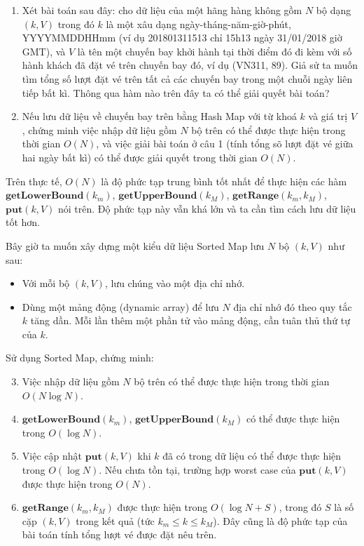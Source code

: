 \documentclass{article}
\begin{document}
 \begin{em}
	\begin{enumerate}
        \item Xét bài toán sau đây: cho dữ liệu của một hãng hàng không gồm $N$ bộ dạng $(k, V)$ trong đó $k$ là một xâu dạng ngày-tháng-năm-giờ-phút, YYYYMMDDHHmm (ví dụ 201801311513 chỉ 15h13 ngày 31/01/2018 giờ GMT), và $V$ là tên một chuyến bay khởi hành tại thời điểm đó đi kèm với số hành khách đã đặt vé trên chuyến bay đó, ví dụ (VN311, 89). Giả sử ta muốn tìm tổng số lượt đặt vé trên tất cả các chuyến bay trong một chuỗi ngày liên tiếp bất kì. Thông qua hàm nào trên đây ta có thể giải quyết bài toán?
		
		\item Nếu lưu dữ liệu về chuyến bay trên bằng Hash Map với từ khoá $k$ và giá trị $V$, chứng minh việc nhập dữ liệu gồm $N$ bộ trên có thể được thực hiện trong thời gian $O(N)$, và việc giải bài toán ở câu 1 (tính tổng sõ lượt đặt vé giữa hai ngày bất kì) có thể được giải quyết trong thời gian $O(N)$.
	\end{enumerate}
\end{em}

Trên thực tế, $O(N)$ là độ phức tạp trung bình tốt nhất để thực hiện các hàm $\textbf{getLowerBound}(k_m)$, $\textbf{getUpperBound}(k_M)$, $\textbf{getRange}(k_m, k_M)$, $\textbf{put}(k, V)$ nói trên. Độ phức tạp này vẫn khá lớn và ta cần tìm cách lưu dữ liệu tốt hơn.

Bây giờ ta muốn xây dựng một kiểu dữ liệu Sorted Map lưu $N$ bộ $(k, V)$ như sau:
\begin{itemize}
	\item Với mỗi bộ $(k, V)$, lưu chúng vào một địa chỉ nhớ.
	\item Dùng một mảng động (dynamic array) để lưu $N$ địa chỉ nhớ đó theo quy tắc $k$ tăng dần. Mỗi lần thêm một phần tử vào mảng động, cần tuân thủ thứ tự của $k$.
\end{itemize}

Sử dụng Sorted Map, chứng minh:

 \begin{em}
	\begin{enumerate}
	    \setcounter{enumi}{2}
        \item Việc nhập dữ liệu gồm $N$ bộ trên có thể được thực hiện trong thời gian $O(N \log N)$.
		
		\item $\textbf{getLowerBound}(k_m)$, $\textbf{getUpperBound}(k_M)$ có thể được thực hiện trong $O(\log N)$.
		
		\item Việc cập nhật $\textbf{put}(k, V)$ khi $k$ đã có trong dữ liệu có thể được thực hiện trong $O(\log N)$. Nếu chưa tồn tại, trường hợp worst case của $\textbf{put}(k, V)$ được thực hiện trong $O(N)$.
		
		\item $\textbf{getRange}(k_m, k_M)$ được thực hiện trong $O(\log N + S)$, trong đó $S$ là số cặp $(k, V)$ trong kết quả (tức $k_m \leq k \leq k_M$). Đây cũng là độ phức tạp của bài toán tính tổng lượt vé được đặt nêu trên.
	\end{enumerate}
\end{em}
\end{document}
